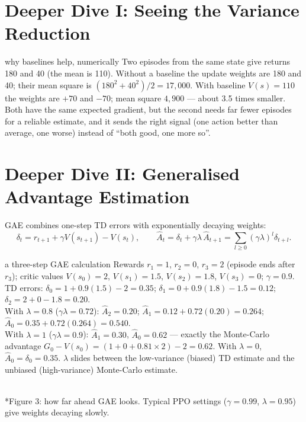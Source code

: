 \documentclass[11pt]{article}
\begin{document}
\section{Deeper Dive I: Seeing the Variance Reduction}
\begin{example}{why baselines help, numerically}
Two episodes from the same state give returns 180 and 40 (the mean is 110). Without a baseline the update weights are 180 and 40; their mean square is $(180^2+40^2)/2=17{,}000$. With baseline $V(s)=110$ the weights are $+70$ and $-70$; mean square $4{,}900$ --- about 3.5 times smaller. Both have the same expected gradient, but the second needs far fewer episodes for a reliable estimate, and it sends the right signal (one action better than average, one worse) instead of ``both good, one more so''.
\end{example}

\section{Deeper Dive II: Generalised Advantage Estimation}
GAE combines one-step TD errors with exponentially decaying weights:
\[\delta_t=r_{t+1}+\gamma V(s_{t+1})-V(s_t),\qquad\hat A_t=\delta_t+\gamma\lambda\,\hat A_{t+1}=\sum_{l\ge0}(\gamma\lambda)^l\delta_{t+l}.\]
\begin{example}{a three-step GAE calculation}
Rewards $r_1=1$, $r_2=0$, $r_3=2$ (episode ends after $r_3$); critic values $V(s_0)=2$, $V(s_1)=1.5$, $V(s_2)=1.8$, $V(s_3)=0$; $\gamma=0.9$.
TD errors: $\delta_0=1+0.9(1.5)-2=0.35$; $\delta_1=0+0.9(1.8)-1.5=0.12$; $\delta_2=2+0-1.8=0.20$.\\
With $\lambda=0.8$ ($\gamma\lambda=0.72$): $\hat A_2=0.20$; $\hat A_1=0.12+0.72(0.20)=0.264$; $\hat A_0=0.35+0.72(0.264)=0.540$.\\
With $\lambda=1$ ($\gamma\lambda=0.9$): $\hat A_1=0.30$, $\hat A_0=0.62$ --- exactly the Monte-Carlo advantage $G_0-V(s_0)=(1+0+0.81\times2)-2=0.62$. With $\lambda=0$, $\hat A_0=\delta_0=0.35$. $\lambda$ slides between the low-variance (biased) TD estimate and the unbiased (high-variance) Monte-Carlo estimate.
\end{example}
\begin{center}\\*{\small\color{GreyN}Figure 3: how far ahead GAE looks. Typical PPO settings ($\gamma=0.99$, $\lambda=0.95$) give weights decaying slowly.}\end{center}
\end{document}
